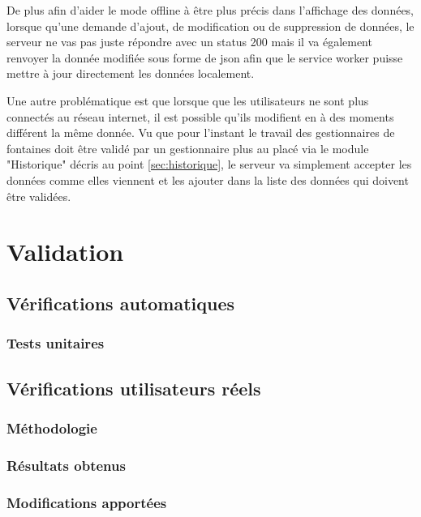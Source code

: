 \documentclass{EPL-master-thesis-covers-FR}
\begin{document}
				De plus afin d'aider le mode offline à être plus précis dans l'affichage des données, lorsque qu'une demande d'ajout, de modification ou de suppression de données, le serveur ne vas pas juste répondre avec un status 200 mais il va également renvoyer la donnée modifiée sous forme de json afin que le service worker puisse mettre à jour directement les données localement.
				
				Une autre problématique est que lorsque que les utilisateurs ne sont plus connectés au réseau internet, il est possible qu'ils modifient en à des moments différent la même donnée. Vu que pour l'instant le travail des gestionnaires de fontaines doit être validé par un gestionnaire plus au placé via le module "Historique" décris au point \ref{sec:historique}, le serveur va simplement accepter les données comme elles viennent et les ajouter dans la liste des données qui doivent être validées.
			

	\chapter{Validation}


		\section{Vérifications automatiques}

			\subsection*{Tests unitaires}

			

		\section{Vérifications utilisateurs réels}


			\subsection*{Méthodologie}

				

			\subsection*{Résultats obtenus}

				

			\subsection*{Modifications apportées}
\end{document}

